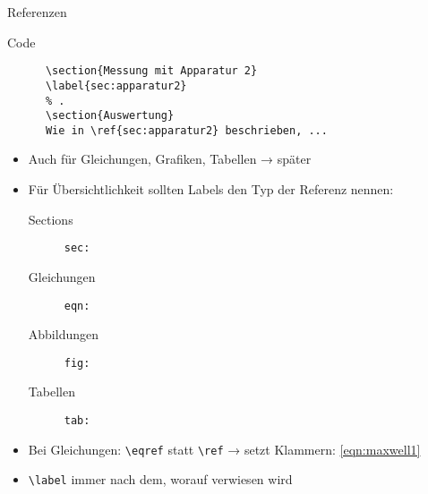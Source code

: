 \begin{frame}[fragile]{Referenzen}
  \begin{block}{Code}
    \begin{lstlisting}
      \section{Messung mit Apparatur 2}
      \label{sec:apparatur2}
      % .
      \section{Auswertung}
      Wie in \ref{sec:apparatur2} beschrieben, ...
    \end{lstlisting}
  \end{block}
  \begin{itemize}
    \item Auch für Gleichungen, Grafiken, Tabellen → später
    \item Für Übersichtlichkeit sollten Labels den Typ der Referenz nennen:
      \begin{description}
        \item[Sections]    \texttt{sec:}
        \item[Gleichungen] \texttt{eqn:}
        \item[Abbildungen] \texttt{fig:}
        \item[Tabellen]    \texttt{tab:}
      \end{description}
    \item Bei Gleichungen: \verb+\eqref+ statt \verb+\ref+ → setzt Klammern: \eqref{eqn:maxwell1}
    \item \verb+\label+ immer nach dem, worauf verwiesen wird
  \end{itemize}
\end{frame}

